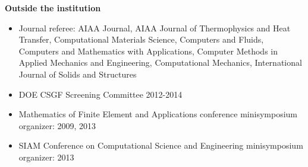 \documentclass[12pt]{article}
\begin{document}
\textbf{Outside the institution}
\begin{itemize}
\item Journal referee: AIAA Journal, AIAA Journal of Thermophysics and Heat Transfer,
  Computational Materials Science, Computers and Fluids, Computers and Mathematics with Applications,
  Computer Methods in Applied Mechanics and Engineering, Computational Mechanics,
  International Journal of Solids and Structures
\item DOE CSGF Screening Committee 2012-2014
\item Mathematics of Finite Element and Applications conference minisymposium organizer: 2009, 2013
\item SIAM Conference on Computational Science and Engineering minisymposium organizer: 2013
\end{itemize}
\end{document}
